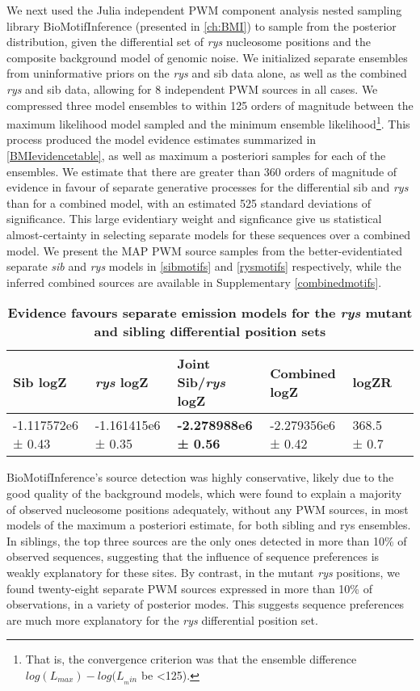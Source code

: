 We next used the Julia independent PWM component analysis nested sampling library BioMotifInference (presented in \autoref{ch:BMI}) to sample from the posterior distribution, given the differential set of \textit{rys} nucleosome positions and the composite background model of genomic noise. We initialized separate ensembles from uninformative priors on the \textit{rys} and sib data alone, as well as the combined \textit{rys} and sib data, allowing for 8 independent PWM sources in all cases. We compressed three model ensembles to within 125 orders of magnitude between the maximum likelihood model sampled and the minimum ensemble likelihood\footnote{That is, the convergence criterion was that the ensemble difference $log(L_{max})-log(L_{_min}$ be <125).}. This process produced the model evidence estimates summarized in \autoref{BMIevidencetable}, as well as maximum a posteriori samples for each of the ensembles. We estimate that there are greater than 360 orders of magnitude of evidence in favour of separate generative processes for the differential sib and \textit{rys} than for a combined model, with an estimated 525 standard deviations of significance. This large evidentiary weight and signficance give us statistical almost-certainty in selecting separate models for these sequences over a combined model.  We present the MAP PWM source samples from the better-evidentiated separate \textit{sib} and \textit{rys} models in \autoref{sibmotifs} and \autoref{rysmotifs} respectively, while the inferred combined sources are available in Supplementary \autoref{combinedmotifs}.

\begin{table}[!ht]
    \centering
    \caption{{\bf Evidence favours separate emission models for the \textit{rys} mutant and sibling differential position sets}}
    \begin{tabular}{|l|l|l|l|l|l|}
        \hline {\bf Sib logZ} & {\bf \textit{rys} logZ} & {\bf Joint Sib/\textit{rys} logZ} & {\bf Combined logZ} & {\bf logZR} \\ \hline
        -1.117572e6 ± 0.43 & -1.161415e6 ± 0.35 & {\bf -2.278988e6 ± 0.56} & -2.279356e6 ± 0.42 &  368.5 ± 0.7 \\ \hline
        \end{tabular}
    \label{BMIevidencetable}
\end{table}

BioMotifInference's source detection was highly conservative, likely due to the good quality of the background models, which were found to explain a majority of observed nucleosome positions adequately, without any PWM sources, in most models of the maximum a posteriori estimate, for both sibling and rys ensembles. In siblings, the top three sources are the only ones detected in more than 10\% of observed sequences, suggesting that the influence of sequence preferences is weakly explanatory for these sites. By contrast, in the mutant \textit{rys} positions, we found twenty-eight separate PWM sources expressed in more than 10\% of observations, in a variety of posterior modes. This suggests sequence preferences are much more explanatory for the \textit{rys} differential position set.

